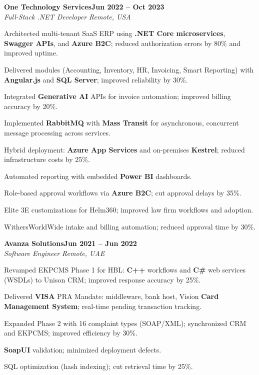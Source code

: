\documentclass[letterpaper,10pt]{article}
\newcommand{\headingBf}[2]{
  \hspace{10pt}\textbf{#1}\hfill\textbf{#2}\\
}
\newcommand{\headingIt}[2]{
  \hspace{10pt}\textit{#1}\hfill\textit{#2}\\
}
\newenvironment{resume_list}{
  \vspace{-7pt}
  \begin{itemize}[itemsep=-2px, parsep=1pt, leftmargin=30pt]
}{
  \end{itemize}
}
\begin{document}
\headingBf{One Technology Services}{Jun 2022 -- Oct 2023}
\headingIt{Full-Stack .NET Developer \hfill Remote, USA}{}
\begin{resume_list}
    \item Architected multi-tenant SaaS ERP using \textbf{.NET Core microservices}, \textbf{Swagger APIs}, and \textbf{Azure B2C}; reduced authorization errors by 80\% and improved uptime.
    \item Delivered modules (Accounting, Inventory, HR, Invoicing, Smart Reporting) with \textbf{Angular.js} and \textbf{SQL Server}; improved reliability by 30\%.
    \item Integrated \textbf{Generative AI} APIs for invoice automation; improved billing accuracy by 20\%.
    \item Implemented \textbf{RabbitMQ} with \textbf{Mass Transit} for asynchronous, concurrent message processing across services.
    \item Hybrid deployment: \textbf{Azure App Services} and on-premises \textbf{Kestrel}; reduced infrastructure costs by 25\%.
    \item Automated reporting with embedded \textbf{Power BI} dashboards.
    \item Role-based approval workflows via \textbf{Azure B2C}; cut approval delays by 35\%.
    \item Elite 3E customizations for Helm360; improved law firm workflows and adoption.
    \item WithersWorldWide intake and billing automation; reduced approval time by 30\%.
\end{resume_list}

\headingBf{Avanza Solutions}{Jun 2021 -- Jun 2022}
\headingIt{Software Engineer \hfill Remote, UAE}{}
\begin{resume_list}
    \item Revamped EKPCMS Phase 1 for HBL: \textbf{C++} workflows and \textbf{C\#} web services (WSDLs) to Unison CRM; improved response accuracy by 25\%.
    \item Delivered \textbf{VISA} PRA Mandate: middleware, bank host, Vision \textbf{Card Management System}; real-time pending transaction tracking.
    \item Expanded Phase 2 with 16 complaint types (SOAP/XML); synchronized CRM and EKPCMS; improved efficiency by 30\%.
    \item \textbf{SoapUI} validation; minimized deployment defects.
    \item SQL optimization (hash indexing); cut retrieval time by 25\%.
\end{resume_list}
\end{document}
